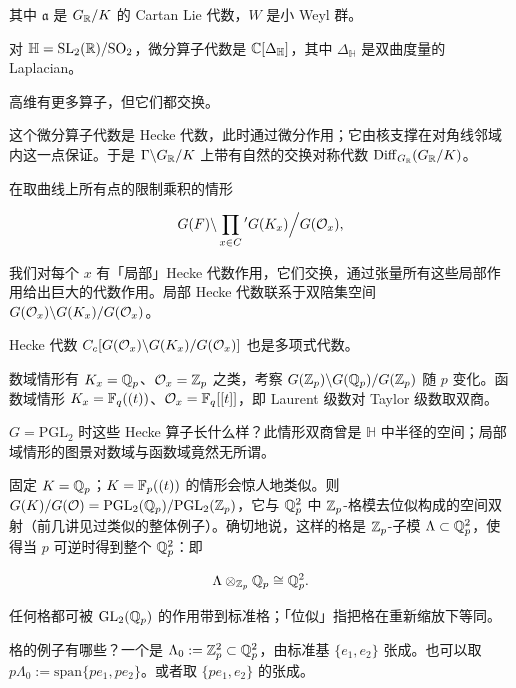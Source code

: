 其中 $\mathfrak{a}$ 是 $G_{\mathbb{R}}/K$ 的 Cartan Lie 代数，$W$ 是小 Weyl 群。

\begin{example}
对 $\mathbb{H}=\mathrm{SL}_2(\mathbb{R})/\mathrm{SO}_2$，微分算子代数是 $\mathbb{C}[\Delta_{\mathbb{H}}]$，其中 $\Delta_{\mathbb{H}}$ 是双曲度量的 Laplacian。
\end{example}

高维有更多算子，但它们都交换。

这个微分算子代数是 Hecke 代数，此时通过微分作用；它由核支撑在对角线邻域内这一点保证。于是 $\Gamma\backslash G_{\mathbb{R}}/K$ 上带有自然的交换对称代数 $\mathrm{Diff}_{G_{\mathbb{R}}}(G_{\mathbb{R}}/K)$。

在取曲线上所有点的限制乘积的情形

\[G(F)\backslash \prod_{x\in C}{}^{\prime} G(K_x)\Big/ G(\mathcal{O}_x),\]

我们对每个 $x$ 有「局部」Hecke 代数作用，它们交换，通过张量所有这些局部作用给出巨大的代数作用。局部 Hecke 代数联系于双陪集空间 $G(\mathcal{O}_x)\backslash G(K_x)/G(\mathcal{O}_x)$。

\begin{theorem}[Satake]
Hecke 代数 $C_c[G(\mathcal{O}_x)\backslash G(K_x)/G(\mathcal{O}_x)]$ 也是多项式代数。
\end{theorem}

数域情形有 $K_x=\mathbb{Q}_p$、$\mathcal{O}_x=\mathbb{Z}_p$ 之类，考察 $G(\mathbb{Z}_p)\backslash G(\mathbb{Q}_p)/G(\mathbb{Z}_p)$ 随 $p$ 变化。函数域情形 $K_x=\mathbb{F}_q((t))$、$\mathcal{O}_x=\mathbb{F}_q[[t]]$，即 Laurent 级数对 Taylor 级数取双商。

\begin{example}
$G=\mathrm{PGL}_2$ 时这些 Hecke 算子长什么样？此情形双商曾是 $\mathbb{H}$ 中半径的空间；局部域情形的图景对数域与函数域竟然无所谓。

固定 $K=\mathbb{Q}_p$；$K=\mathbb{F}_p((t))$ 的情形会惊人地类似。则 $G(K)/G(\mathcal{O})=\mathrm{PGL}_2(\mathbb{Q}_p)/\mathrm{PGL}_2(\mathbb{Z}_p)$，它与 $\mathbb{Q}_p^2$ 中 $\mathbb{Z}_p$-格模去位似构成的空间双射（前几讲见过类似的整体例子）。确切地说，这样的格是 $\mathbb{Z}_p$-子模 $\Lambda\subset\mathbb{Q}_p^2$，使得当 $p$ 可逆时得到整个 $\mathbb{Q}_p^2$：即

\[\Lambda\otimes_{\mathbb{Z}_p}\mathbb{Q}_p\cong \mathbb{Q}_p^2.\]

任何格都可被 $\mathrm{GL}_2(\mathbb{Q}_p)$ 的作用带到标准格；「位似」指把格在重新缩放下等同。

格的例子有哪些？一个是 $\Lambda_0:=\mathbb{Z}_p^2\subset\mathbb{Q}_p^2$，由标准基 $\{e_1,e_2\}$ 张成。也可以取 $p\Lambda_0:=\mathrm{span}\{pe_1,pe_2\}$。或者取 $\{pe_1,e_2\}$ 的张成。
\end{example}



